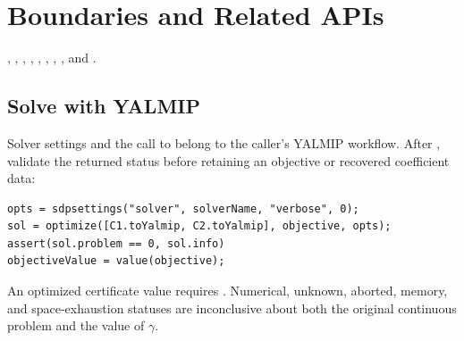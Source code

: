 \section{Boundaries and Related APIs}
, , , , , , , , and .

\subsection{Solve with YALMIP}
\label{sec:pdlmi-solver-use}

Solver settings and the call to  belong to the caller's YALMIP workflow. After , validate the returned status before retaining an objective or recovered coefficient data:

\begin{lstlisting}[style=dpsyntax]
opts = sdpsettings("solver", solverName, "verbose", 0);
sol = optimize([C1.toYalmip, C2.toYalmip], objective, opts);
assert(sol.problem == 0, sol.info)
objectiveValue = value(objective);
\end{lstlisting}

An optimized certificate value requires . Numerical, unknown, aborted, memory, and space-exhaustion statuses are inconclusive about both the original continuous problem and the value of $\gamma$.
